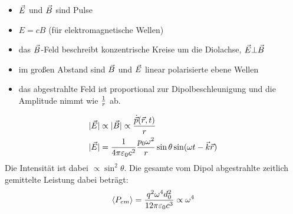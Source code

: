 \begin{itemize}
	\item $\vec{E}$ und $\vec{B}$ sind Pulse
	\item $E=cB$ (für elektromagnetische Wellen)
	\item das $\vec{B}$-Feld beschreibt konzentrische Kreise um die Diolachse, $\vec{E}\bot\vec{B}$
	\item im großen Abstand sind $\vec{B}$ und $\vec{E}$ linear polarisierte ebene Wellen
	\item das abgestrahlte Feld ist proportional zur Dipolbeschleunigung und die Amplitude nimmt wie $\frac{1}{r}$ ab.
\end{itemize}
\begin{align*}
	\vert \vec{E}\vert&\propto\vert\vec{B}\vert\propto\frac{\dot{\vec{p}}(\vec{r},t)}{r}\\
	\vert\vec{E}\vert&=\frac{1}{4\pi\varepsilon_0 c^2}\frac{p_0\omega^2}{r}\sin\theta\sin(\omega t-\vec{k}\vec{r})
\end{align*}
Die Intensität ist dabei $\propto\sin^2\theta$. Die gesamte vom Dipol abgestrahlte zeitlich gemittelte Leistung dabei beträgt:
\begin{align*}
	\langle P_{em}\rangle=\frac{q^2\omega^4 d_0^2}{12\pi\varepsilon_0 c^3}\propto\omega^4
\end{align*}


